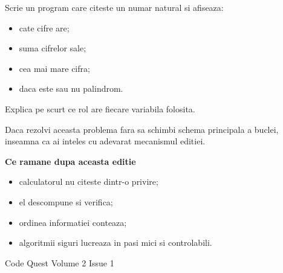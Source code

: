 
\begin{bossbox}
  Scrie un program care citeste un numar natural si afiseaza:
  \begin{itemize}
    \item cate cifre are;
    \item suma cifrelor sale;
    \item cea mai mare cifra;
    \item daca este sau nu palindrom.
  \end{itemize}
  Explica pe scurt ce rol are fiecare variabila folosita.
\end{bossbox}

\begin{guidebox}
  Daca rezolvi aceasta problema fara sa schimbi schema principala a buclei, inseamna ca ai inteles cu adevarat mecanismul editiei.
\end{guidebox}

\newpage
{}
\pagecolor{white}
\color{black}
\thispagestyle{empty}
\null
\clearpage

\pagecolor{cqbg}
\color{cqtext}
\thispagestyle{empty}
\begin{center}
\vspace*{2.8cm}
{\Huge\bfseries \IssueTitle}\par
\vspace{0.6em}
{\Large \IssueSubtitle}\par
\vspace{2em}

\begin{tcolorbox}[colback=cqcodebg,colframe=cqcyan,boxrule=1pt,arc=2mm,width=0.82\linewidth]
\small
\textbf{Ce ramane dupa aceasta editie}
\begin{itemize}
\item calculatorul nu citeste dintr-o privire;
\item el descompune si verifica;
\item ordinea informatiei conteaza;
\item algoritmii siguri lucreaza in pasi mici si controlabili.
\end{itemize}
\end{tcolorbox}

\vfill
{\ttfamily\small Code Quest \textbullet{} Volume 2 \textbullet{} Issue 1}
\vspace*{2.4cm}
\end{center}
